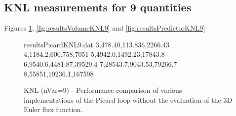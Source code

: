 \documentclass{acm_proc_article-sp}
\begin{document}
\subsection{KNL measurements for 9 quantities} \label{sec:app2}

Figures \ref{fig:resultsPicardKNL9}, \ref{fig:resultsVolumeKNL9} and \ref{fig:resultsPredictorKNL9}

\begin{figure}[!h]
\begin{filecontents}{resultsPicardKNL9.dat}
3,478.40,113.836,2266.43
4,1184.2,600.758,7051
5,4942.0,1492.23,17843.8
6,9540.6,4481.87,39529.4
7,28543.7,9043.53,79266.7
8,55851,19236.1,167598
\end{filecontents}
\pgfplotsset{scaled y ticks=false}
\caption{KNL (nVar=9) - Performance comparison of various implementations of the Picard loop without the evaluation of the 3D Euler flux function.}\label{fig:resultsPicardKNL9}
\end{figure}
\end{document}

